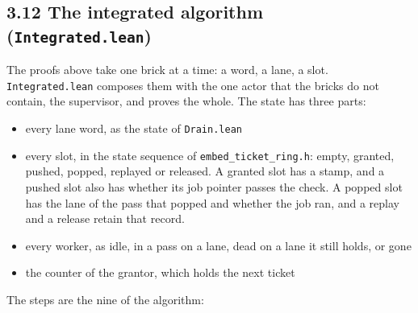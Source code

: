\subsection{\texorpdfstring{3.12 The integrated algorithm (\texttt{Integrated.\allowbreak{}lean})}{3.12 The integrated algorithm (Integrated.lean)}}

The proofs above take one brick at a time: a word, a lane, a slot. \texttt{Integrated.\allowbreak{}lean} composes them with the one actor that the bricks do not contain, the supervisor, and proves the whole. The state has three parts:

\begin{itemize}
\item every lane word, as the state of \texttt{Drain.\allowbreak{}lean}
\item every slot, in the state sequence of \texttt{embed\_\allowbreak{}ticket\_\allowbreak{}ring.\allowbreak{}h}: empty, granted, pushed, popped, replayed or released. A granted slot has a stamp, and a pushed slot also has whether its job pointer passes the check. A popped slot has the lane of the pass that popped and whether the job ran, and a replay and a release retain that record.
\item every worker, as idle, in a pass on a lane, dead on a lane it still holds, or gone
\item the counter of the grantor, which holds the next ticket
\end{itemize}

The steps are the nine of the algorithm:

